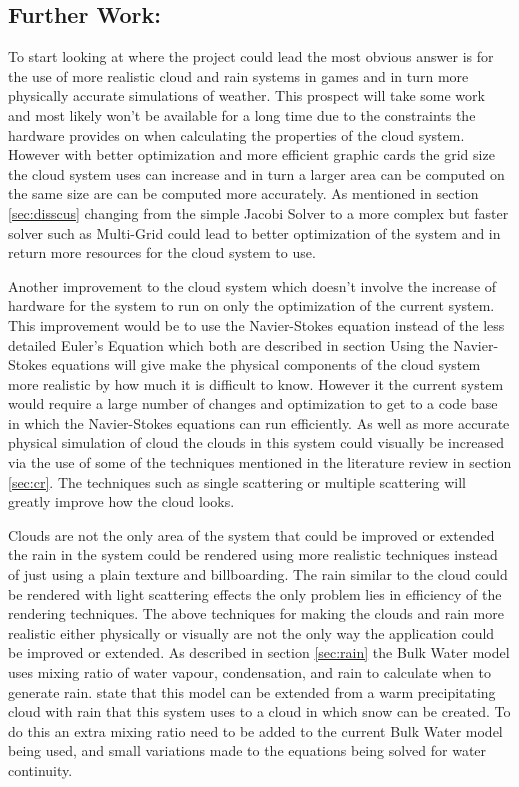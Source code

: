 \subsection{Further Work:}
\label{sec:fw}
To start looking at where the project could lead the most obvious answer is for the use of more realistic cloud and rain systems in games and in turn more physically accurate simulations of weather.
This prospect will take some work and most likely won't be available for a long time due to the constraints the hardware provides on when calculating the properties of the cloud system.
However with better optimization and more efficient graphic cards the grid size the cloud system uses can increase and in turn a larger area can be computed on the same size are can be computed more accurately.
As mentioned in section \ref{sec:disscus} changing from the simple Jacobi Solver to a more complex but faster solver such as Multi-Grid could lead to better optimization of the system and in return more resources for the cloud system to use.

Another improvement to the cloud system which doesn't involve the increase of hardware for the system to run on only the optimization of the current system.
This improvement would be to use the Navier-Stokes equation instead of the less detailed Euler's Equation which both are described in section %
Using the Navier-Stokes equations will give make the physical components of the cloud system more realistic by how much it is difficult to know.
However it the current system would require a large number of changes and optimization to get to a code base in which the Navier-Stokes equations can run efficiently. 
As well as more accurate physical simulation of cloud the clouds in this system could visually be increased via the use of some of the techniques mentioned in the literature review in section \ref{sec:cr}.
The techniques such as single scattering or multiple scattering will greatly improve how the cloud looks. 

Clouds are not the only area of the system that could be improved or extended the rain in the system could be rendered using more realistic techniques instead of just using a plain texture and billboarding.
The rain similar to the cloud could be rendered with light scattering effects the only problem lies in efficiency of the rendering techniques. 
The above techniques for making the clouds and rain more realistic either physically or visually are not the only way the application could be improved or extended.
As described in section \ref{sec:rain} the Bulk Water model uses mixing ratio of water vapour, condensation, and rain to calculate when to generate rain.
\cite{houze1994cloud} state that this model can be extended from a warm precipitating cloud with rain that this system uses to a cloud in which snow can be created.
To do this an extra mixing ratio need to be added to the current Bulk Water model being used, and small variations made to the equations being solved for water continuity.

